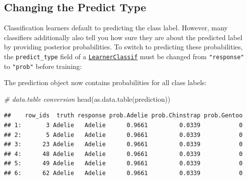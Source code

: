 \documentclass[
]{scrbook}
\newenvironment{Shaded}{\begin{snugshade}}{\end{snugshade}}
\newcommand{\AttributeTok}[1]{\textcolor[rgb]{0.77,0.63,0.00}{#1}}
\newcommand{\CommentTok}[1]{\textcolor[rgb]{0.56,0.35,0.01}{\textit{#1}}}
\newcommand{\FunctionTok}[1]{\textcolor[rgb]{0.00,0.00,0.00}{#1}}
\newcommand{\NormalTok}[1]{#1}
\newcommand{\OtherTok}[1]{\textcolor[rgb]{0.56,0.35,0.01}{#1}}
\newcommand{\SpecialCharTok}[1]{\textcolor[rgb]{0.00,0.00,0.00}{#1}}
\newcommand{\StringTok}[1]{\textcolor[rgb]{0.31,0.60,0.02}{#1}}
\renewenvironment{Shaded} {\begin{snugshade}\small} {\end{snugshade}}
\begin{document}
\hypertarget{predict-type}{%
\subsection{Changing the Predict Type}\label{predict-type}}

Classification learners default to predicting the class label.
However, many classifiers additionally also tell you how sure they are about the predicted label by providing posterior probabilities.
To switch to predicting these probabilities, the \texttt{predict\_type} field of a \href{https://mlr3.mlr-org.com/reference/LearnerClassif.html}{\texttt{LearnerClassif}} must be changed from \texttt{"response"} to \texttt{"prob"} before training:

\begin{Shaded}
\end{Shaded}

The prediction object now contains probabilities for all class labels:

\begin{Shaded}
\begin{Highlighting}[]
\CommentTok{\# data.table conversion}
\FunctionTok{head}\NormalTok{(}\FunctionTok{as.data.table}\NormalTok{(prediction))}
\end{Highlighting}
\end{Shaded}

\begin{verbatim}
##    row_ids  truth response prob.Adelie prob.Chinstrap prob.Gentoo
## 1:       3 Adelie   Adelie      0.9661         0.0339           0
## 2:       5 Adelie   Adelie      0.9661         0.0339           0
## 3:      23 Adelie   Adelie      0.9661         0.0339           0
## 4:      48 Adelie   Adelie      0.9661         0.0339           0
## 5:      49 Adelie   Adelie      0.9661         0.0339           0
## 6:      62 Adelie   Adelie      0.9661         0.0339           0
\end{verbatim}
\end{document}

